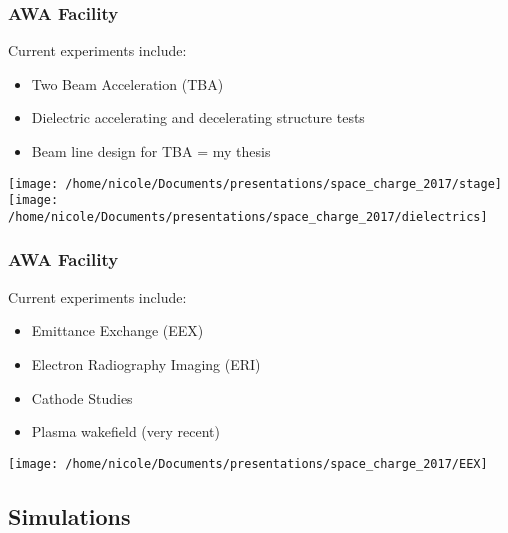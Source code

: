 \documentclass[professionalfonts,t]{beamer}
\begin{document}
\begin{frame}
\frametitle{AWA Facility}
Current experiments include:
\begin{itemize}
	\item{Two Beam Acceleration (TBA)}
	\item{Dielectric accelerating and decelerating structure tests}
	\item{Beam line design for TBA = my thesis}
\end{itemize}
\vspace{0.5cm}
\texttt{[image: /home/nicole/Documents/presentations/space\_charge\_2017/stage]}\hfill\texttt{[image: /home/nicole/Documents/presentations/space\_charge\_2017/dielectrics]}

\end{frame}

\begin{frame}
\frametitle{AWA Facility}
Current experiments include:
\begin{itemize}
\item{Emittance Exchange (EEX)}
\item{Electron Radiography Imaging (ERI)}
\item{Cathode Studies}
\item Plasma wakefield (very recent)
\end{itemize}
\vspace{0.3cm}
\centering
\texttt{[image: /home/nicole/Documents/presentations/space\_charge\_2017/EEX]}
\end{frame}


\subsection{Simulations}
	
\end{document}
